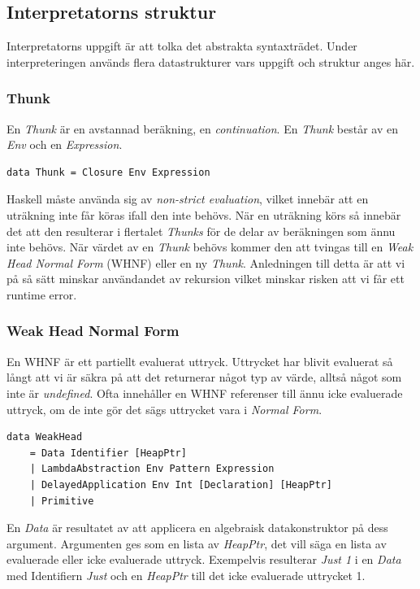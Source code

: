 \subsection{Interpretatorns struktur}
Interpretatorns uppgift är att tolka det abstrakta syntaxträdet. Under interpreteringen används flera datastrukturer vars uppgift och struktur anges här.

\subsubsection{Thunk}
En \emph{Thunk} är en avstannad beräkning, en \emph{continuation}. En \emph{Thunk} består av en \emph{Env} och en \emph{Expression}.

\begin{lstlisting}
data Thunk = Closure Env Expression
\end{lstlisting}

Haskell måste använda sig av \emph{non-strict evaluation}, vilket innebär att en uträkning inte får köras ifall den inte behövs. När en uträkning körs så innebär det att den resulterar i flertalet \emph{Thunks} för de delar av beräkningen som ännu inte behövs. När värdet av en \emph{Thunk} behövs kommer den att tvingas till en \emph{Weak Head Normal Form} (WHNF) eller en ny \emph{Thunk}. Anledningen till detta är att vi på så sätt minskar användandet av rekursion vilket minskar risken att vi får ett runtime error.

\subsubsection{Weak Head Normal Form}
En WHNF är ett partiellt evaluerat uttryck. Uttrycket har blivit evaluerat så långt att vi är säkra på att det returnerar något typ av värde, alltså något som inte är \emph{undefined}. Ofta innehåller en WHNF referenser till ännu icke evaluerade uttryck, om de inte gör det sägs uttrycket vara i \emph{Normal Form}.

\begin{lstlisting}
data WeakHead 
    = Data Identifier [HeapPtr]
    | LambdaAbstraction Env Pattern Expression
    | DelayedApplication Env Int [Declaration] [HeapPtr]
    | Primitive
\end{lstlisting}

En \emph{Data} är resultatet av att applicera en algebraisk datakonstruktor på dess argument. Argumenten ges som en lista av \emph{HeapPtr}, det vill säga en lista av evaluerade eller icke evaluerade uttryck. Exempelvis resulterar \emph{Just 1} i en \emph{Data} med Identifiern \emph{Just} och en \emph{HeapPtr} till det icke evaluerade uttrycket 1.

